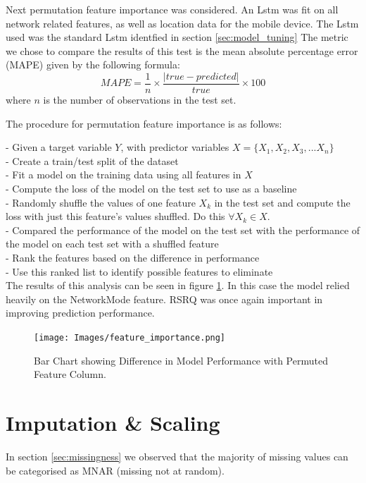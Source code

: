 Next permutation feature importance was considered. An Lstm was fit on all network related features, as well as location data for the mobile device. The Lstm used was the standard Lstm identfied in section \ref{sec:model_tuning} The metric we chose to compare the results of this test is the mean absolute percentage error (MAPE) given by the following formula: \\

\begin{equation}
MAPE = \frac{1}{n} \times \frac{\left|true-predicted\right|}{true} \times 100
\end{equation}
where $n$ is the number of observations in the test set.

The procedure for permutation feature importance is as follows:

- Given a target variable $Y$, with predictor variables $X=\{X_1,X_2,X_3,...X_n\}$ \\
- Create a train/test split of the dataset \\
- Fit a model on the training data using all features in $X$ \\
- Compute the loss of the model on the test set to use as a baseline \\
- Randomly shuffle the values of one feature $X_k$ in the test set and compute the loss with just this feature's values shuffled. Do this $\forall X_k \in X$. \\
- Compared the performance of the model on the test set with the performance of the model on each test set with a shuffled feature \\
- Rank the features based on the difference in performance \\
- Use this ranked list to identify possible features to eliminate \\

The results of this analysis can be seen in figure \ref{fig:feature_importance}. In this case the model relied heavily on the NetworkMode feature. RSRQ was once again important in improving prediction performance. 
\newpage
\begin{figure}[h]
\texttt{[image: Images/feature\_importance.png]}
\centering
\caption{Bar Chart showing Difference in Model Performance with Permuted Feature Column.}
\label{fig:feature_importance}
\end{figure}


\section{Imputation \& Scaling}
In section \ref{sec:missingness} we observed that the majority of missing values can be categorised as MNAR (missing not at random). 